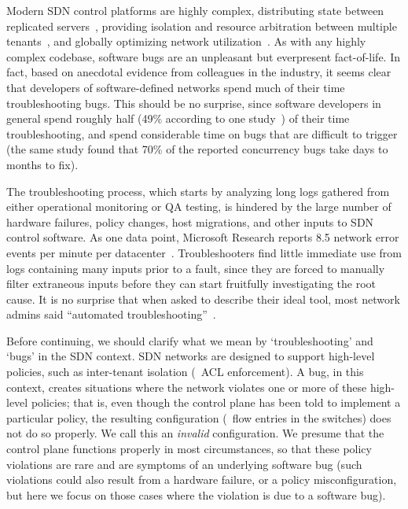 Modern SDN control platforms are highly complex,
distributing state between replicated
servers~\cite{floodlight},
providing isolation and resource arbitration between multiple
tenants~\cite{Casado:2010:VNF:1921151.1921162}, and
globally optimizing network utilization~\cite{urs}.
As with any highly complex codebase, software bugs are an unpleasant but everpresent fact-of-life. In fact, based on anecdotal evidence from colleagues in the industry, it seems clear that
developers of software-defined networks spend much of their time
troubleshooting bugs. This should be no surprise, since software developers in
general spend roughly half (49\% according to one
study~\cite{msoft_concurrency}) of their time troubleshooting, and spend
considerable time on bugs that are difficult to trigger
(the same study found that 70\% of the reported concurrency bugs
take days to months to fix).

The troubleshooting process, which starts by analyzing long logs gathered from either operational monitoring or QA testing, is hindered by the large number of hardware failures,
policy changes, host migrations, and other inputs to SDN control software.
As one data point, Microsoft Research
reports 8.5 network error events per minute per
datacenter~\cite{Greenberg:2009:VSF:1592568.1592576}.
Troubleshooters find little immediate use from logs containing many inputs
prior to a fault,
since they are forced to manually filter extraneous inputs
before they can start fruitfully investigating the root cause.
It is no surprise that when asked to describe their
ideal tool, most network admins said ``automated troubleshooting''~\cite{Zeng:Survey}.


Before continuing, we should clarify what we mean by `troubleshooting' and `bugs' in the SDN context.
SDN networks are designed to support high-level policies, such as inter-tenant
isolation (\ie~ACL enforcement). A bug, in this context, creates situations
where the network violates one or more of these high-level policies; that is, even though the control plane
has been told to implement a particular policy, the resulting configuration (\ie~flow entries in the switches)
does not do so properly. We call this an {\em invalid} configuration.
We presume that the control plane functions properly in most circumstances, so
that these policy violations are rare and are symptoms of an underlying software bug (such violations could also result from a hardware failure, or a policy misconfiguration, but here we focus on those cases where the violation is due to a software bug).

